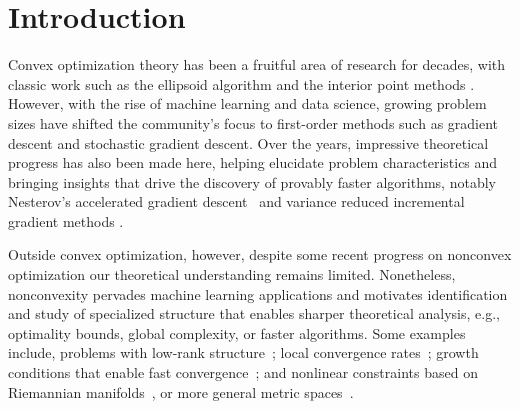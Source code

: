 \section{Introduction}

Convex optimization theory has been a fruitful area of research for decades, with classic work such as the ellipsoid algorithm \citep{khachiyan1980polynomial} and the interior point methods \citep{karmarkar1984new}. However, with the rise of machine learning and data science, growing problem sizes have shifted the community's focus to first-order methods such as gradient descent and stochastic gradient descent.  Over the years, impressive theoretical progress has also been made here, helping elucidate problem characteristics and bringing
insights that drive the discovery of provably faster algorithms, notably Nesterov's accelerated gradient descent~ \citep{nesterov1983method} and variance reduced incremental gradient methods \citep[e.g.,][]{johnson2013accelerating,schmidt2013minimizing,defazio2014saga}.

Outside convex optimization, however, despite some recent progress on nonconvex optimization our theoretical understanding remains limited. Nonetheless, nonconvexity pervades machine learning applications and  motivates identification and study of specialized structure that enables sharper theoretical analysis, e.g., optimality bounds, global complexity, or faster algorithms. Some examples include, problems with low-rank structure~\citep{boumal2016non,ge2017no,sun2017complete,kawaguchi2016deep}; local convergence rates~\citep{ghadimi2013stochastic,Reddi16,Agarwal16,Yair16}; growth conditions that enable fast convergence~\citep{Polyak1963,zhang2016riemannian,attouch2013convergence,shamir2015stochastic}; and nonlinear constraints based on Riemannian manifolds~\citep{boumal2016global,zhang2016first,zhang2016riemannian,mishra2016}, or more general metric spaces~\citep{ambrosio2014metric,bacak2014convex}.

